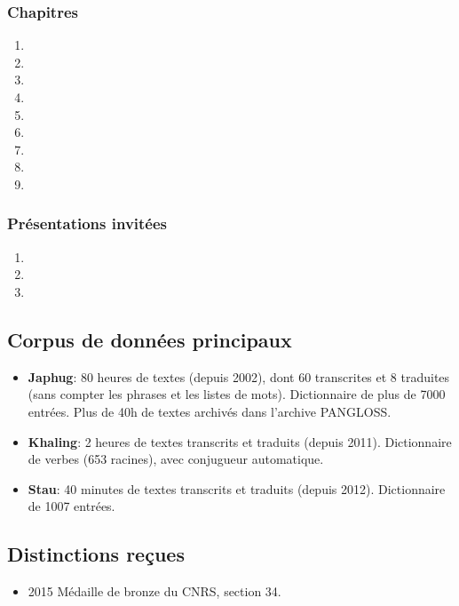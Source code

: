 \documentclass[oldfontcommands,oneside,a4paper,11pt]{article}
\begin{document}
   \subsubsection{Chapitres}
\begin{enumerate}
\item   {}  
\item   {}  
\item   {}  
\item   {}  
\item   {}   
\item   {}   
\item   {}   
\item   {}   
\item   {}   
  \end{enumerate}
  \subsubsection{Présentations invitées}
\begin{enumerate}
\item {}
\item {}
\item {}
\end{enumerate} 
\subsection{Corpus de données principaux}
\begin{itemize}
\item \textbf{Japhug}: 80 heures de textes (depuis 2002), dont 60 transcrites et 8 traduites (sans compter les phrases et les listes de mots). Dictionnaire de plus de 7000 entrées. Plus de 40h de textes archivés dans l'archive PANGLOSS.
\item \textbf{Khaling}: 2 heures de textes transcrits et traduits (depuis 2011). Dictionnaire de verbes (653 racines), avec conjugueur automatique.
\item \textbf{Stau}: 40 minutes de textes transcrits et traduits (depuis 2012). Dictionnaire de 1007 entrées.
  \end{itemize}
  
\subsection{Distinctions reçues}  
\begin{itemize}
\item 2015 Médaille de bronze du CNRS, section 34.
\end{itemize}
  
\end{document}
